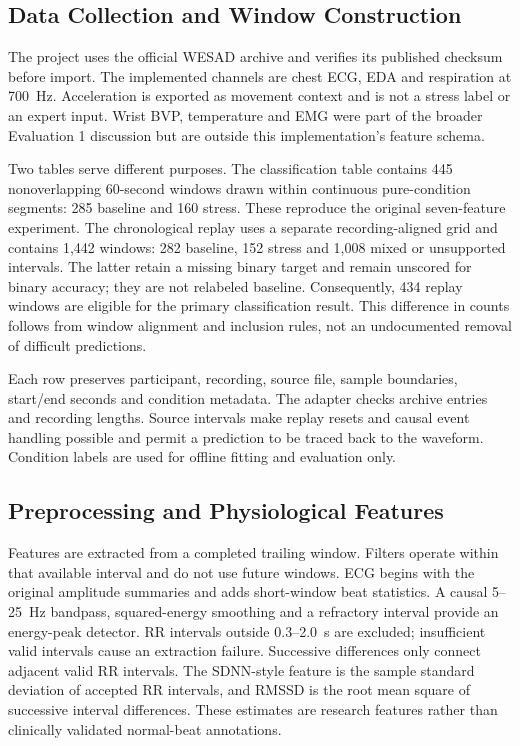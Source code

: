 \documentclass[conference,a4paper]{IEEEtran}
\begin{document}
\subsection{Data Collection and Window Construction}
The project uses the official WESAD archive and verifies its published checksum before import. The implemented channels are chest ECG, EDA and respiration at 700~Hz. Acceleration is exported as movement context and is not a stress label or an expert input. Wrist BVP, temperature and EMG were part of the broader Evaluation 1 discussion but are outside this implementation's feature schema.

Two tables serve different purposes. The classification table contains 445 nonoverlapping 60-second windows drawn within continuous pure-condition segments: 285 baseline and 160 stress. These reproduce the original seven-feature experiment. The chronological replay uses a separate recording-aligned grid and contains 1,442 windows: 282 baseline, 152 stress and 1,008 mixed or unsupported intervals. The latter retain a missing binary target and remain unscored for binary accuracy; they are not relabeled baseline. Consequently, 434 replay windows are eligible for the primary classification result. This difference in counts follows from window alignment and inclusion rules, not an undocumented removal of difficult predictions.

Each row preserves participant, recording, source file, sample boundaries, start/end seconds and condition metadata. The adapter checks archive entries and recording lengths. Source intervals make replay resets and causal event handling possible and permit a prediction to be traced back to the waveform. Condition labels are used for offline fitting and evaluation only.

\subsection{Preprocessing and Physiological Features}
Features are extracted from a completed trailing window. Filters operate within that available interval and do not use future windows. ECG begins with the original amplitude summaries and adds short-window beat statistics. A causal 5--25~Hz bandpass, squared-energy smoothing and a refractory interval provide an energy-peak detector. RR intervals outside 0.3--2.0~s are excluded; insufficient valid intervals cause an extraction failure. Successive differences only connect adjacent valid RR intervals. The SDNN-style feature is the sample standard deviation of accepted RR intervals, and RMSSD is the root mean square of successive interval differences. These estimates are research features rather than clinically validated normal-beat annotations.
\end{document}
